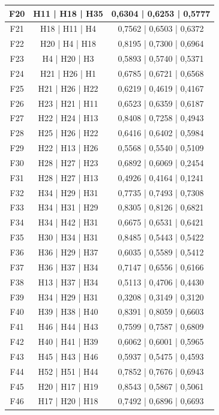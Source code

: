 \documentclass{prgrado}
\begin{document}
\begin{longtable}{|c|c|c|}
F20 & H11 | H18 | H35 & 0,6304 | 0,6253 | 0,5777 \\ \hline
F21 & H18 | H11 | H4 & 0,7562 | 0,6503 | 0,6372 \\ \hline
F22 & H20 | H4 | H18 & 0,8195 | 0,7300 | 0,6964 \\ \hline
F23 & H4 | H20 | H3 & 0,5893 | 0,5740 | 0,5371 \\ \hline
F24 & H21 | H26 | H1 & 0,6785 | 0,6721 | 0,6568 \\ \hline
F25 & H21 | H26 | H22 & 0,6219 | 0,4619 | 0,4167 \\ \hline
F26 & H23 | H21 | H11 & 0,6523 | 0,6359 | 0,6187 \\ \hline
F27 & H22 | H24 | H13 & 0,8408 | 0,7258 | 0,4943 \\ \hline
F28 & H25 | H26 | H22 & 0,6416 | 0,6402 | 0,5984 \\ \hline
F29 & H22 | H13 | H26 & 0,5568 | 0,5540 | 0,5109 \\ \hline
F30 & H28 | H27 | H23 & 0,6892 | 0,6069 | 0,2454 \\ \hline
F31 & H28 | H27 | H13 & 0,4926 | 0,4164 | 0,1241 \\ \hline
F32 & H34 | H29 | H31 & 0,7735 | 0,7493 | 0,7308 \\ \hline
F33 & H34 | H31 | H29 & 0,8305 | 0,8126 | 0,6821 \\ \hline
F34 & H34 | H42 | H31 & 0,6675 | 0,6531 | 0,6421 \\ \hline
F35 & H30 | H34 | H31 & 0,8485 | 0,5443 | 0,5422 \\ \hline
F36 & H36 | H29 | H37 & 0,6035 | 0,5589 | 0,5412 \\ \hline
F37 & H36 | H37 | H34 & 0,7147 | 0,6556 | 0,6166 \\ \hline
F38 & H13 | H37 | H34 & 0,5113 | 0,4706 | 0,4430 \\ \hline
F39 & H34 | H29 | H31 & 0,3208 | 0,3149 | 0,3120 \\ \hline
F40 & H39 | H38 | H40 & 0,8391 | 0,8059 | 0,6603 \\ \hline
F41 & H46 | H44 | H43 & 0,7599 | 0,7587 | 0,6809 \\ \hline
F42 & H40 | H41 | H39 & 0,6062 | 0,6001 | 0,5965 \\ \hline
F43 & H45 | H43 | H46 & 0,5937 | 0,5475 | 0,4593 \\ \hline
F44 & H52 | H51 | H44 & 0,7852 | 0,7676 | 0,6943 \\ \hline
F45 & H20 | H17 | H19 & 0,8543 | 0,5867 | 0,5061 \\ \hline
F46 & H17 | H20 | H18 & 0,7492 | 0,6896 | 0,6693 \\ \hline

\end{longtable}
\end{document}
